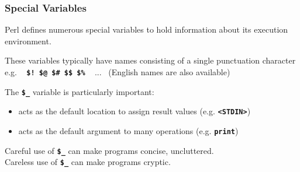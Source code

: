 \begin{frame}
\frametitle{Special Variables}
Perl defines numerous special variables to hold information about its
execution environment.

These variables typically have names consisting of a single punctuation
character e.g. ~ \textbf{\tt{\$!  \$@  \$\#  \$\$  \$\%}} ~ ...
	~{\small (English names are also available)}

The \textbf{\tt{\$\_}} variable is particularly important:
\begin{itemize}
\item  acts as the default location to assign result values (e.g. \textbf{\tt{{\textless}STDIN>}})
\item  acts as the default argument to many operations (e.g. \textbf{\tt{print}})
\end{itemize}
Careful use of \textbf{\tt{\$\_}} can make programs concise, uncluttered. \\
Careless use of \textbf{\tt{\$\_}} can make programs cryptic.
\end{frame}

